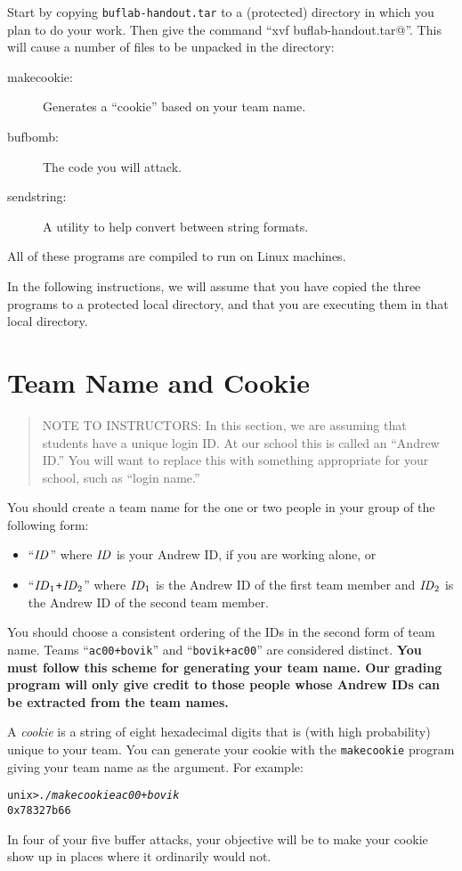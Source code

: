 \documentclass[11pt]{article}
\newenvironment{tty}%
{\small\begin{alltt}}%
{\end{alltt}}
\begin{document}
Start by copying \texttt{buflab-handout.tar} to a (protected) directory
in which you plan to do your work.  Then give the command
``\verb@tar xvf buflab-handout.tar@''.  This will cause a number of files
to be unpacked in the directory:
\begin{description}
\item[{\sc makecookie}:] Generates a ``cookie'' based on your team name.
\item[{\sc bufbomb}:] The code you will attack.
\item[{\sc sendstring}:] A utility to help convert between string formats.
\end{description}
All of these programs are compiled to run on Linux machines.

In the following instructions, we will assume that you have copied the three
programs to a protected local directory, and that you are executing them in
that local directory.


\section*{Team Name and Cookie}

\begin{quote}
NOTE TO INSTRUCTORS: In this section, we are assuming that students
have a unique login ID. At our school this is called an ``Andrew ID.''
You will want to replace this with something appropriate for your
school, such as ``login name.''
\end{quote}

You should create a team name for the one or two people in your group
of the following form:
\begin{itemize}
\item ``${\it ID}$'' where ${\it ID}$ is your Andrew ID, if you are
working alone, or
\item ``${\it ID}_1${\tt +}${\it ID}_2$'' where ${\it ID}_1$ is the
Andrew ID of the first team member and ${\it ID}_2$ is the Andrew ID
of the second team member.  
\end{itemize}
You should choose a consistent ordering of the IDs in the second form
of team name.  Teams ``{\tt ac00+bovik}'' and ``{\tt bovik+ac00}'' are
considered distinct.  {\bf You must follow this scheme for generating
your team name.  Our grading program will only give credit to those
people whose Andrew IDs can be extracted from the team names.}

A {\em cookie} is a string of eight hexadecimal digits that is (with high
probability) unique to your team.  You can generate your cookie with
the {\tt makecookie} program giving your team name as the argument.
For example:
\begin{tty}
unix>{\em ./makecookie ac00+bovik}
0x78327b66
\end{tty}
In four of your five buffer attacks, your objective will be to make
your cookie show up in places where it ordinarily would not.
\end{document}
